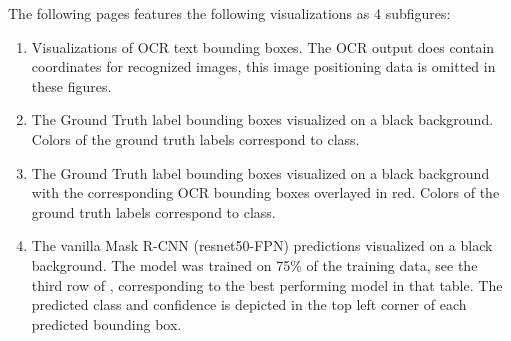 \documentclass[oneside, english, bibtex]{kththesis}
\begin{document}
The following pages features the following visualizations as 4 subfigures: 
\begin{enumerate}
\item Visualizations of OCR text bounding boxes. The OCR output does contain coordinates for recognized images, this image positioning data is omitted in these figures. 
\item The Ground Truth label bounding boxes visualized on a black background. Colors of the ground truth labels correspond to class.
\item The Ground Truth label bounding boxes visualized on a black background with the corresponding OCR bounding boxes overlayed in red. Colors of the ground truth labels correspond to class.
\item The vanilla Mask R-CNN (resnet50-FPN) predictions visualized on a black background. The model was trained on 75\% of the training data, see the third row of , corresponding to the best performing model in that table. The predicted class and confidence is depicted in the top left corner of each predicted bounding box.
\end{enumerate}
\clearpage
\end{document}
